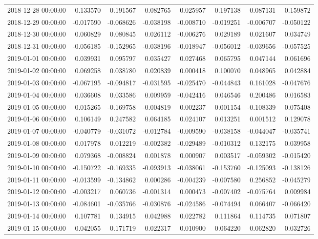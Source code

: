 \begin{tabular}{lrrrrrrr}
2018-12-28 00:00:00 & 0.133570 & 0.191567 & 0.082765 & 0.025957 & 0.197138 & 0.087131 & 0.159872 \\
2018-12-29 00:00:00 & -0.017590 & -0.068626 & -0.038198 & -0.008710 & -0.019251 & -0.006707 & -0.050122 \\
2018-12-30 00:00:00 & 0.060829 & 0.080845 & 0.026112 & -0.006276 & 0.029189 & 0.021607 & 0.034749 \\
2018-12-31 00:00:00 & -0.056185 & -0.152965 & -0.038196 & -0.018947 & -0.056012 & -0.039656 & -0.057525 \\
2019-01-01 00:00:00 & 0.039931 & 0.095797 & 0.035427 & 0.027468 & 0.065795 & 0.047144 & 0.061696 \\
2019-01-02 00:00:00 & 0.069258 & 0.038780 & 0.020839 & 0.000418 & 0.100070 & 0.048965 & 0.042884 \\
2019-01-03 00:00:00 & -0.067195 & -0.094817 & -0.031595 & -0.025470 & -0.044843 & 0.161028 & -0.047676 \\
2019-01-04 00:00:00 & 0.036608 & 0.033586 & 0.009959 & -0.042416 & 0.046546 & 0.200486 & 0.016583 \\
2019-01-05 00:00:00 & 0.015265 & -0.169758 & -0.004819 & 0.002237 & 0.001154 & -0.108339 & 0.075408 \\
2019-01-06 00:00:00 & 0.106149 & 0.247582 & 0.064185 & 0.024107 & 0.013251 & 0.001512 & 0.129078 \\
2019-01-07 00:00:00 & -0.040779 & -0.031072 & -0.012784 & -0.009590 & -0.038158 & -0.044047 & -0.035741 \\
2019-01-08 00:00:00 & 0.017978 & 0.012219 & -0.002382 & -0.029489 & -0.010312 & 0.132175 & 0.039958 \\
2019-01-09 00:00:00 & 0.079368 & -0.008824 & 0.001878 & 0.000907 & 0.003517 & -0.059302 & -0.015420 \\
2019-01-10 00:00:00 & -0.150722 & -0.169335 & -0.093913 & -0.038061 & -0.153760 & -0.125093 & -0.138126 \\
2019-01-11 00:00:00 & -0.013599 & -0.134862 & 0.000286 & -0.004239 & -0.007580 & 0.256852 & -0.045279 \\
2019-01-12 00:00:00 & -0.003217 & 0.060736 & -0.001314 & 0.000473 & -0.007402 & -0.075764 & 0.009984 \\
2019-01-13 00:00:00 & -0.084601 & -0.035766 & -0.030876 & -0.024586 & -0.074494 & 0.066407 & -0.066420 \\
2019-01-14 00:00:00 & 0.107781 & 0.134915 & 0.042988 & 0.022782 & 0.111864 & 0.114735 & 0.071807 \\
2019-01-15 00:00:00 & -0.042055 & -0.171719 & -0.022317 & -0.010900 & -0.064220 & 0.062820 & -0.032726 \\

\end{tabular}
